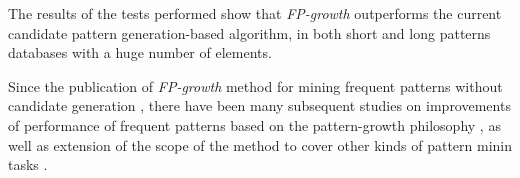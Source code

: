 \documentclass[12pt, a4paper]{article}
\begin{document}
The results of the tests performed show that \textit{FP-growth} outperforms the current candidate pattern generation-based algorithm, in both short and long patterns databases with a huge number of elements.

Since the publication of \textit{FP-growth} method for mining frequent patterns without candidate generation \cite{han2000}, there have been many subsequent studies on improvements of performance of frequent patterns based on the pattern-growth philosophy \cite{zhang2014}, as well as extension of the scope of the method to cover other kinds of pattern minin tasks \cite{li2012}.




\end{document}

